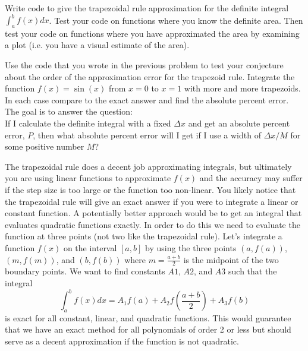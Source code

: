\begin{problem}
    Write code to give the trapezoidal rule approximation for the definite integral
    $\int_a^b f(x) dx$.  Test your code on functions where you know the definite area.
    Then test your code on functions where you have approximated the area by examining a
    plot (i.e. you have a visual estimate of the area).
\end{problem}

\begin{problem}
    Use the code that you wrote in the previous problem to test your conjecture about the
    order of the approximation error for the trapezoid rule.  Integrate the function $f(x)
    = \sin(x)$ from $x=0$ to $x=1$ with more and more trapezoids.  In each case compare to
    the exact answer and find the absolute percent error.  The goal is to answer the
    question: \\
    If I calculate the definite integral with a fixed $\Delta x$ and get an absolute
    percent error, $P$, then what absolute percent error will I get if I use a width of
    $\Delta x / M$ for some positive number $M$?
\end{problem}

The trapezoidal rule does a decent job approximating integrals, but ultimately you are
using linear functions to approximate $f(x)$ and the accuracy may suffer if the step
size is too large or the function too non-linear. You likely notice that the trapezoidal
rule will give an exact answer if you were to integrate a linear or constant function. A
potentially better approach would be to get an integral that evaluates quadratic functions
exactly. In order to do this we need to evaluate the function at three points (not two
like the trapezoidal rule). Let's integrate a function $f(x)$ on the interval
$[a,b]$ by using the three points $(a,f(a))$, $(m,f(m))$, and
$(b,f(b))$ where $m=\frac{a+b}{2}$ is the midpoint of the two boundary points. We want to
find constants $A1$, $A2$, and $A3$ such that the integral
\[ \int_a^b f(x) dx = A_1 f(a) + A_2 f\left( \frac{a+b}{2} \right) + A_3 f(b) \]
is exact for all constant, linear, and quadratic functions. This would guarantee that we
have an exact method for all polynomials of order 2 or less but should serve as a decent
approximation if the function is not quadratic.

